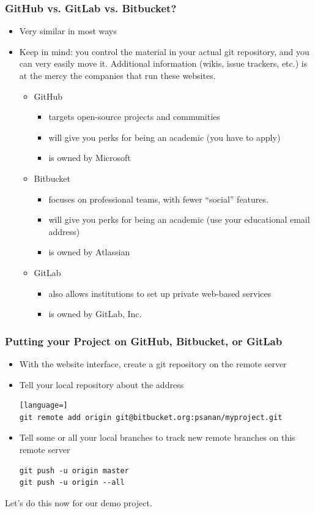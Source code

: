 \documentclass{beamer}
\begin{document}
\begin{frame}[fragile]
\frametitle{GitHub vs. GitLab vs. Bitbucket?}
\begin{itemize}
\item Very similar in most ways
\item Keep in mind: you control the material in your actual git repository, and you can very easily move it. Additional information (wikis, issue trackers, etc.) is at the mercy the companies that run these websites.
\begin{itemize}
\item
GitHub
\begin{itemize}
\item targets open-source projects and communities
\item will give you perks for being an academic (you have to apply)
\item is owned by Microsoft
\end{itemize}
\item Bitbucket
\begin{itemize}
\item focuses on professional teams, with fewer ``social'' features.
\item will give you perks for being an academic (use  your educational email address)
\item is owned by Atlassian
\end{itemize}
\item GitLab
\begin{itemize}
\item also allows institutions to set up private web-based services
\item is owned by GitLab, Inc.
\end{itemize}
\end{itemize}
\end{itemize}
\end{frame}

\begin{frame}[fragile]
\frametitle{Putting your Project on GitHub, Bitbucket, or GitLab}
\begin{itemize}
\item With the website interface, create a git repository on the remote server
\item Tell your local repository about the address
\begin{lstlisting}[language=]
git remote add origin git@bitbucket.org:psanan/myproject.git
\end{lstlisting}
\item Tell some or all your local branches to track new remote branches on this remote server
\begin{lstlisting}
git push -u origin master
git push -u origin --all
\end{lstlisting}
\end{itemize}

Let's do this now for our demo project.

\end{frame}
\end{document}
